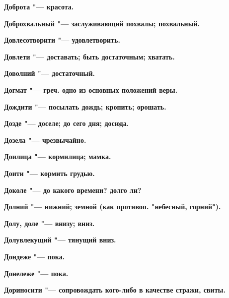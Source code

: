 \bfseries Доброта \normalfont{} "--- красота. 




\bfseries Доброхвальный \normalfont{} "--- заслуживающий похвалы; похвальный. 




\bfseries Довлесотворити \normalfont{} "--- удовлетворить. 




\bfseries Довлети \normalfont{} "--- доставать; быть достаточным; хватать. 




\bfseries Доволний \normalfont{} "--- достаточный. 




\bfseries Догмат \normalfont{} "--- греч. одно из основных положений веры. 




\bfseries Дождити \normalfont{} "--- посылать дождь; кропить; орошать. 




\bfseries Дозде \normalfont{} "--- доселе; до сего дня; досюда. 




\bfseries Дозела \normalfont{} "--- чрезвычайно. 




\bfseries Доилица \normalfont{} "--- кормилица; мамка. 




\bfseries Доити \normalfont{} "--- кормить грудью. 




\bfseries Доколе \normalfont{} "--- до какого времени? долго ли? 




\bfseries Долний \normalfont{} "--- нижний; земной (как противоп. "небесный, горний"). 




\bfseries Долу, доле \normalfont{} "--- внизу; вниз. 




\bfseries Долувлекущий \normalfont{} "--- тянущий вниз. 




\bfseries Дондеже \normalfont{} "--- пока. 




\bfseries Донележе \normalfont{} "--- пока. 




\bfseries Дориносити \normalfont{} "--- сопровождать кого-либо в качестве стражи, свиты. 




